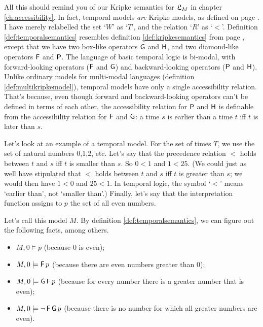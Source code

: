 All this should remind you of our Kripke semantics for $\mathfrak{L}_M$ in chapter
\ref{ch:accessibility}. In fact, temporal models \emph{are} Kripke models, as
defined on page \pageref{def:kripkemodel}. I have merely relabelled the set
`$W$' as `$T$', and the relation `$R$' as `$<$'. Definition
\ref{def:temporalsemantics} resembles definition \ref{def:kripkesemantics} from
page \pageref{def:kripkesemantics}, except that we have two box-like operators
$\operatorname{\mathsf{G}}$ and $\operatorname{\mathsf{H}}$, and two diamond-like operators $\operatorname{\mathsf{F}}$ and $\operatorname{\mathsf{P}}$. The language of
basic temporal logic is bi-modal, with forward-looking operators ($\operatorname{\mathsf{F}}$ and
$\operatorname{\mathsf{G}}$) and backward-looking operators ($\operatorname{\mathsf{P}}$ and $\operatorname{\mathsf{H}}$). Unlike ordinary models
for multi-modal languages (definition \ref{def:multikripkemodel}), temporal
models have only a single accessibility relation. That's because, even though
forward and backward-looking operators can't be defined in terms of each other,
the accessibility relation for $\operatorname{\mathsf{P}}$ and $\operatorname{\mathsf{H}}$ is definable from the
accessibility relation for $\operatorname{\mathsf{F}}$ and $\operatorname{\mathsf{G}}$: a time $s$ is earlier than a time
$t$ iff $t$ is later than $s$.


Let's look at an example of a temporal model. For the set of times $T$, we use
the set of natural numbers 0,1,2, etc. Let's say that the precedence relation
$<$ holds between $t$ and $s$ iff $t$ is smaller than $s$. So $0<1$ and
$1 < 25$. (We could just as well have stipulated that $<$ holds between $t$ and
$s$ iff $t$ is greater than $s$; we would then have $1<0$ and $25<1$. In
temporal logic, the symbol `$<$' means `earlier than', not `smaller than'.)
Finally, let's say that the interpretation function assigns to $p$ the set of
all even numbers.

Let's call this model $M$. By definition \ref{def:temporalsemantics}, we can
figure out the following facts, among others.
\begin{itemize}[leftmargin=10mm]
\itemsep-1mm
\item $M,0 \models p$ (because 0 is even);
\item $M,0 \models \operatorname{\mathsf{F}} p$ (because there are even numbers greater than 0);
\item $M,0 \models \operatorname{\mathsf{G}}\operatorname{\mathsf{F}} p$ (because for every number there is a greater number that is even);
\item $M,0 \models \neg\operatorname{\mathsf{F}}\operatorname{\mathsf{G}} p$ (because there is no number for which all greater numbers are even).
\end{itemize}

